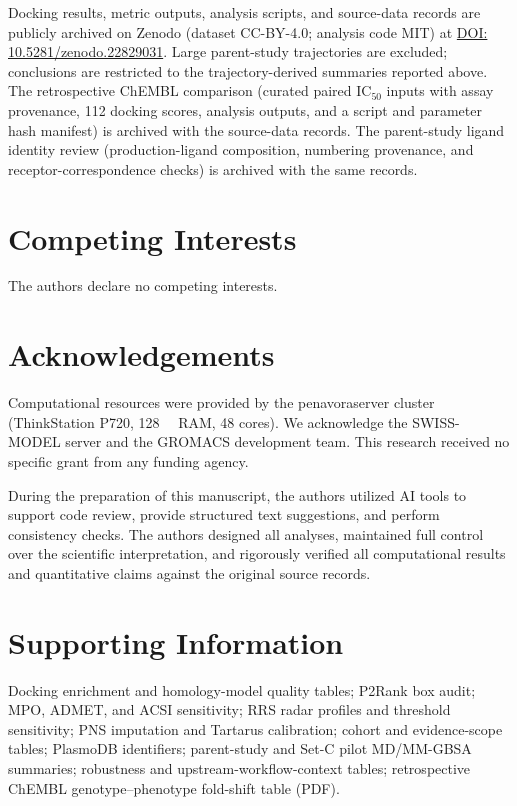\documentclass[11pt,a4paper]{article}
\begin{document}
Docking results, metric outputs, analysis scripts, and source-data records are publicly archived on Zenodo (dataset CC-BY-4.0; analysis code MIT) at \href{https://doi.org/10.5281/zenodo.22829031}{DOI: 10.5281/zenodo.22829031}. Large parent-study trajectories are excluded; conclusions are restricted to the trajectory-derived summaries reported above. The retrospective ChEMBL comparison (curated paired IC$_{50}$ inputs with assay provenance, \num{112} docking scores, analysis outputs, and a script and parameter hash manifest) is archived with the source-data records. The parent-study ligand identity review (production-ligand composition, numbering provenance, and receptor-correspondence checks) is archived with the same records.


\section*{Competing Interests}

The authors declare no competing interests.

\section*{Acknowledgements}
Computational resources were provided by the penavoraserver cluster (ThinkStation P720, \qty{128}{\giga\byte} RAM, \num{48} cores). We acknowledge the SWISS-MODEL server and the GROMACS development team. This research received no specific grant from any funding agency.

During the preparation of this manuscript, the authors utilized AI tools to support code review, provide structured text suggestions, and perform consistency checks. The authors designed all analyses, maintained full control over the scientific interpretation, and rigorously verified all computational results and quantitative claims against the original source records.

\section*{Supporting Information}
Docking enrichment and homology-model quality tables; P2Rank box audit; MPO, ADMET, and ACSI sensitivity; RRS radar profiles and threshold sensitivity; PNS imputation and Tartarus calibration; cohort and evidence-scope tables; PlasmoDB identifiers; parent-study and Set-C pilot MD/MM-GBSA summaries; robustness and upstream-workflow-context tables; retrospective ChEMBL genotype--phenotype fold-shift table (PDF).



\end{document}
